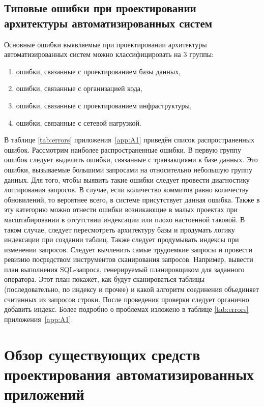 \subsection{Типовые ошибки при проектировании архитектуры автоматизированных систем}\label{sec:ch1/sec5/sub2}
Основные ошибки выявляемые при проектировании архитектуры автоматизированных систем можно классифицировать на 3 группы:
\begin{enumerate}
    \item  ошибки, связанные с проектированием базы данных,
    \item  ошибки, связанные с организацией кода,
    \item  ошибки, связанные с проектированием инфраструктуры,
    \item  ошибки, связанные с сетевой нагрузкой.
\end{enumerate}
В таблице \cref{tab:errors} приложения~\cref{app:A1} приведён список распространенных ошибок.
Рассмотрим наиболее распространенные ошибки. В первую группу ошибок следует выделить ошибки, связанные с транзакциями к базе данных. Это ошибки, вызываемые большими запросами на относительно небольшую группу данных. Для того, чтобы выявить такие ошибки следует провести диагностику логгирования запросов. В случае, если количество коммитов равно количеству обновилений, то вероятнее всего, в системе присутствует данная ошибка. Также в эту категорию можно отнести ошибки возникающие в малых проектах при масштабировании в отсутствии индексации или плохо настоенной таковой. В таком случае, следует пересмотреть архитектуру базы и продумать логику индексации при создании таблиц. Также следует продумывать индексы при изменении запросов. Следует вычленить самые трудоемкие запросы и провести ревизию посредством инструментов сканирования запросов. Например, вывести план выполнения SQL-запроса, генерируемый планировщиком для заданного оператора. Этот план покажет, как будут сканироваться таблицы (последовательно, по индексу и прочее) и какой алгоритм соединения объединяет считанных из запросов строки. После проведения проверки следует органично добавить индекс. Более подробно о проблемах изложено в таблице \cref{tab:errors} приложения~\cref{app:A1}.





\section{Обзор существующих средств проектирования автоматизированных приложений}\label{sec:ch1/sec6}
